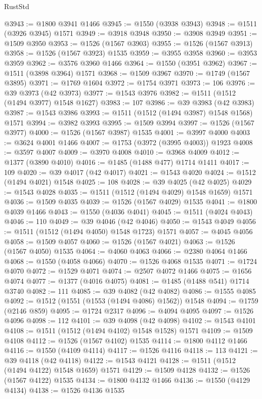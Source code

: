 \begin{lexlean}{RustStd}
\begin{coremodule}
{\begin{coremodule}
{{{{{{{{{{{{{{{{{{{{{{{{{{{{{{{{{{{@3943 := @1800 @3941 @1466
@3945 := @1550 (@3938 @3943)
@3948 := @1511 (@3926 @3945) @1571
@3949 := @3918 @3948
@3950 := @3908 @3949
@3951 := @1509 @3950
@3953 := @1526 (@1567 @3903)
@3955 := @1526 (@1567 @3913)
@3958 := @1526 (@1567 @3923) @1535
@3959 := @3955 @3958
@3960 := @3953 @3959
@3962 := @3576 @3960 @1466
@3964 := @1550 (@3951 @3962)
@3967 := @1511 (@3898 @3964) @1571
@3968 := @1509 @3967
@3970 := @1749 (@1567 @3895)
@3971 := @1769 @1604
@3972 := @1754 @3971
@3973 := 106
@3976 := @39 @3973 (@42 @3973)
@3977 := @1543 @3976
@3982 := @1511 (@1512 (@1494 @3977) @1548 @1627)
@3983 := 107
@3986 := @39 @3983 (@42 @3983)
@3987 := @1543 @3986
@3993 := @1511 (@1512 (@1494 @3987) @1548 @1568) @1571
@3994 := @3982 @3993
@3995 := @1509 @3994
@3997 := @1526 (@1567 @3977)
@4000 := @1526 (@1567 @3987) @1535
@4001 := @3997 @4000
@4003 := @3624 @4001 @1466
@4007 := @1753 (@3972 (@3995 @4003)) @1923
@4008 := @3597 @4007
@4009 := @3970 @4008
@4010 := @3968 @4009
@4012 := @1377 (@3890 @4010)
@4016 := @1485 (@1488 @477) @1714 @1411
@4017 := 109
@4020 := @39 @4017 (@42 @4017)
@4021 := @1543 @4020
@4024 := @1512 (@1494 @4021) @1548
@4025 := 108
@4028 := @39 @4025 (@42 @4025)
@4029 := @1543 @4028
@4035 := @1511 (@1512 (@1494 @4029) @1548 @1659) @1571
@4036 := @1509 @4035
@4039 := @1526 (@1567 @4029) @1535
@4041 := @1800 @4039 @1466
@4043 := @1550 (@4036 @4041)
@4045 := @1511 (@4024 @4043)
@4046 := 110
@4049 := @39 @4046 (@42 @4046)
@4050 := @1543 @4049
@4056 := @1511 (@1512 (@1494 @4050) @1548 @1723) @1571
@4057 := @4045 @4056
@4058 := @1509 @4057
@4060 := @1526 (@1567 @4021)
@4063 := @1526 (@1567 @4050) @1535
@4064 := @4060 @4063
@4066 := @2380 @4064 @1466
@4068 := @1550 (@4058 @4066)
@4070 := @1526 @4068 @1535
@4071 := @1724 @4070
@4072 := @1529 @4071
@4074 := @2507 @4072 @1466
@4075 := @1656 @4074
@4077 := @1377 (@4016 @4075)
@4081 := @1485 (@1488 @541) @1714 @3740
@4082 := 111
@4085 := @39 @4082 (@42 @4082)
@4086 := @1555 @4085
@4092 := @1512 (@1551 (@1553 (@1494 @4086) @1562)) @1548
@4094 := @1759 (@2146 @859)
@4095 := @1724 @2317
@4096 := @4094 @4095
@4097 := @1526 @4096
@4098 := 112
@4101 := @39 @4098 (@42 @4098)
@4102 := @1543 @4101
@4108 := @1511 (@1512 (@1494 @4102) @1548 @1528) @1571
@4109 := @1509 @4108
@4112 := @1526 (@1567 @4102) @1535
@4114 := @1800 @4112 @1466
@4116 := @1550 (@4109 @4114)
@4117 := @1526 @4116
@4118 := 113
@4121 := @39 @4118 (@42 @4118)
@4122 := @1543 @4121
@4128 := @1511 (@1512 (@1494 @4122) @1548 @1659) @1571
@4129 := @1509 @4128
@4132 := @1526 (@1567 @4122) @1535
@4134 := @1800 @4132 @1466
@4136 := @1550 (@4129 @4134)
@4138 := @1526 @4136 @1535
}}}}}}}}}}}}}}}}}}}}}}}}}}}}}}}}}}}
\end{coremodule}}
\end{coremodule}
\end{lexlean}
